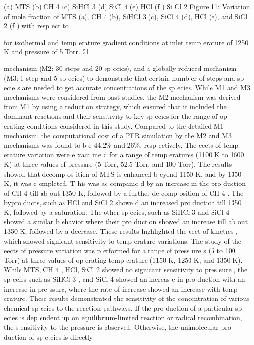 \documentclass[10pt, letterpaper]{article}
\begin{document}
(a) MTS
(b) CH
4
(c) SiHCl
3
(d) SiCl
4
(e) HCl
(f ) Si Cl
2
Figure 11: Variation of mole fraction of MTS (a), CH
4
(b), SiHCl
3
(c), SiCl
4
(d), HCl (e), and SiCl
2
(f ) with resp ect to

for
isothermal and temp erature gradient conditions at inlet temp erature of 1250 K and pressure of 5 Torr.
21


mechanism (M2: 30 steps and 20 sp ecies), and a globally reduced mechanism (M3: 1 step and 5 sp ecies)
to demonstrate that certain numb er of steps and sp ecie s are needed to get accurate concentrations of the
sp ecies. While M1 and M3 mechanisms were considered from past studies, the M2 mechanism was derived
from M1 by using a reduction strategy, which ensured that it included the dominant reactions and their
sensitivity to key sp ecies for the range of op erating conditions considered in this study. Compared to the
detailed M1 mechanism, the computational cost of a PFR simulation by the M2 and M3 mechanisms was
found to b e 44.2\% and 26\%, resp ectively.
The eects of temp erature variation were e xam ine d for a range of temp eratures (1100 K to 1600 K) at
three values of pressure (5 Torr, 52.5 Torr, and 100 Torr). The results showed that decomp os ition of MTS
is enhanced b eyond 1150 K, and by 1350 K, it was c ompleted. T his was ac companie d by an increase in the
pro duction of CH
4
till ab out 1350 K, followed by a further de comp osition of CH
4
. The bypro ducts, such as
HCl and SiCl
2
showe d an increased pro duction till 1350 K, followed by a saturation. The other sp ecies, such
as SiHCl
3
and SiCl
4
showed a similar b ehavior where their pro duction showed an increase till ab out 1350 K,
followed by a decrease. These results highlighted the eect of kinetics , which showed signicant sensitivity
to temp erature variations.
The study of the eects of pressure variation was p erformed for a range of press ure s (5 to 100 Torr) at
three values of op erating temp erature (1150 K, 1250 K, and 1350 K). While MTS, CH
4
, HCl, SiCl
2
showed
no signicant sensitivity to pres sure , the sp ecies such as SiHCl
3
, and SiCl
4
showed an increas e in pro duction
with an increase in pre ssure, where the rate of increase showed an increase with temp erature. These results
demonstrated the sensitivity of the concentration of various chemical sp ecies to the reaction pathways. If the
pro duction of a particular sp ecies is dep endent up on equilibrium-limited reaction or radical recombination,
the s ensitivity to the pressure is observed. Otherwise, the unimolecular pro duction of sp e cies is directly
\end{document}
